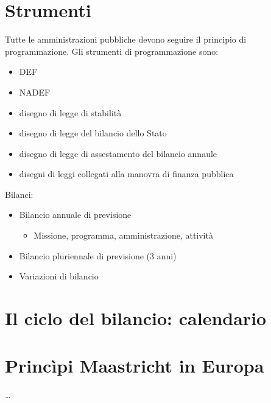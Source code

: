 \documentclass[letterpaper,10pt,italian]{jupyterBook}
\begin{document}
\section{Strumenti}
\label{\detokenize{ch/public:strumenti}}
\sphinxAtStartPar
Tutte le amministrazioni pubbliche devono seguire il principio di programmazione. Gli strumenti di programmazione sono:
\begin{itemize}
\item {} 
\sphinxAtStartPar
DEF

\item {} 
\sphinxAtStartPar
NADEF

\item {} 
\sphinxAtStartPar
disegno di legge di stabilità

\item {} 
\sphinxAtStartPar
disegno di legge del bilancio dello Stato

\item {} 
\sphinxAtStartPar
disegno di legge di assestamento del bilancio annaule

\item {} 
\sphinxAtStartPar
disegni di leggi collegati alla manovra di finanza pubblica

\end{itemize}

\sphinxAtStartPar
Bilanci:
\begin{itemize}
\item {} 
\sphinxAtStartPar
Bilancio annuale di previsione
\begin{itemize}
\item {} 
\sphinxAtStartPar
Missione, programma, amministrazione, attività

\end{itemize}

\item {} 
\sphinxAtStartPar
Bilancio pluriennale di previsione (3 anni)

\item {} 
\sphinxAtStartPar
Variazioni di bilancio

\end{itemize}


\section{Il ciclo del bilancio: calendario}
\label{\detokenize{ch/public:il-ciclo-del-bilancio-calendario}}

\section{Princìpi \sphinxhyphen{} Maastricht in Europa}
\label{\detokenize{ch/public:principi-maastricht-in-europa}}
\sphinxAtStartPar
…
\end{document}
